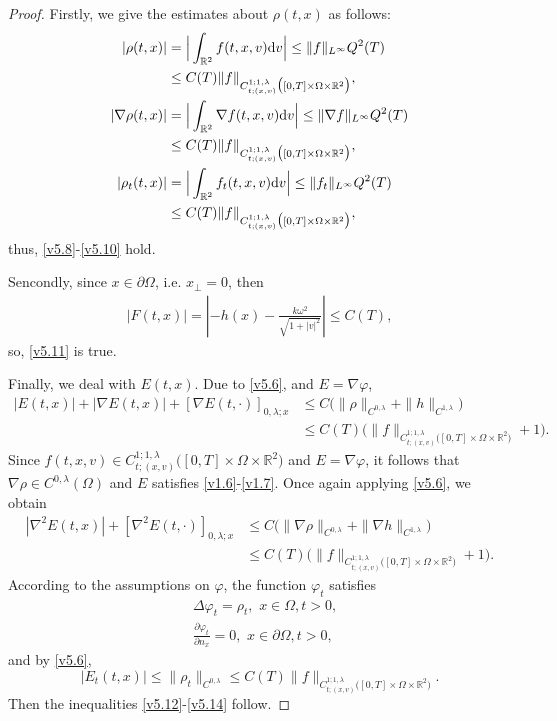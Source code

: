 \documentclass[11pt,reqno]{amsart}%
\theoremstyle{definition}
\theoremstyle{remark}
\begin{document}
\begin{proof}
Firstly, we give the estimates about $\rho(t,x)$ as follows:
\begin{align}
|\rho(t,x)|&= \Big|\int_{\mathbb{R}^{2}}f(t,x,v){\rm d}v\Big|\leq \|f\|_{L^{\infty}}Q^{2}(T)\nonumber\\
&\leq C(T)\|f\|_{C^{1;1,\lambda}_{t;(x,v)}\big([0,T]\times\Omega\times\mathbb{R}^{2}\big)},\nonumber\\
|\nabla \rho(t,x)|&= \Big|\int_{\mathbb{R}^{2}}\nabla f(t,x,v){\rm d}v\Big|\leq \|\nabla f\|_{L^{\infty}}Q^{2}(T)\nonumber\\
&\leq C(T)\|f\|_{C^{1;1,\lambda}_{t;(x,v)}\big([0,T]\times\Omega\times\mathbb{R}^{2}\big)},\nonumber\\
|\rho_{t}(t,x)|&= \Big|\int_{\mathbb{R}^{2}}f_{t}(t,x,v){\rm d}v\Big|\leq \|f_{t}\|_{L^{\infty}}Q^{2}(T)\nonumber\\
&\leq C(T)\|f\|_{C^{1;1,\lambda}_{t;(x,v)}\big([0,T]\times\Omega\times\mathbb{R}^{2}\big)},\nonumber
\end{align}
thus, \eqref{v5.8}-\eqref{v5.10} hold.

Sencondly, since $x\in\partial\Omega$,\,\,i.e. $x_{\bot}=0$, then
\begin{align}
|F(t,x)|=|-h(x)-\frac{k \omega^{2}}{\sqrt{1+|v|^{2}}}|
\leq C(T), \nonumber
\end{align}
so, \eqref{v5.11} is true.

Finally, we deal with $E(t,x)$. Due to \eqref{v5.6}, and $E=\nabla \varphi$,
\begin{align}
|E(t,x)|+|\nabla E(t,x)|+[\nabla E(t,\cdot)]_{0,\lambda;x}&\leq  C\Big(\|\rho\|_{C^{0,\lambda}}+\|h\|_{C^{1,\lambda}}\Big)\nonumber\\
&\leq  C(T)\Big(\|f\|_{C^{1;1,\lambda}_{t;(x,v)}\big([0,T]\times\Omega\times\mathbb{R}^{2}\big)}+1\Big).\nonumber
\end{align}
Since $f(t,x,v)\in C^{1;1,\lambda}_{t;(x,v)}\big([0,T] \times\Omega\times\mathbb{R}^{2}\big)$ and $E=\nabla\varphi$, it follows that
$\nabla \rho \in  C^{0,\lambda}(\Omega)$ and $E$ satisfies \eqref{v1.6}-\eqref{v1.7}. Once again applying \eqref{v5.6}, we obtain
\begin{align}
|\nabla^{2}E(t,x)|+[\nabla^{2} E(t,\cdot)]_{0,\lambda;x}&\leq  C\Big(\|\nabla \rho\|_{C^{0,\lambda}}+\|\nabla h\|_{C^{1,\lambda}}\Big)\nonumber\\
&\leq  C(T)\Big(\|f\|_{C^{1;1,\lambda}_{t;(x,v)}\big([0,T]\times\Omega\times\mathbb{R}^{2}\big)}+1\Big).\nonumber
\end{align}
According to the assumptions on $\varphi$, the function $\varphi_{t}$ satisfies
\begin{align}
&\Delta\varphi_{t}=\rho_{t}, \,\,x\in \Omega,t>0, \nonumber\\
&\frac{\partial \varphi_{t}}{\partial n_{x}}=0,\,\, x\in \partial \Omega,t>0,\nonumber
\end{align}
and by \eqref{v5.6},
$$|E_{t}(t,x)|\leq\|\rho_{t}\|_{C^{0,\lambda}} \leq C(T)\|f\|_{C^{1;1,\lambda}_{t;(x,v)}\big([0,T]\times\Omega\times\mathbb{R}^{2}\big)}.$$
Then  the inequalities \eqref{v5.12}-\eqref{v5.14} follow.
\end{proof}
\end{document}

